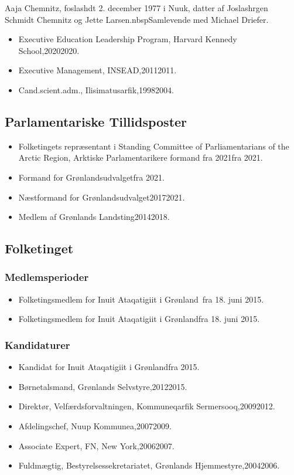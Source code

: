 \documentclass[11pt, a4paper]{awesome-cv}
\begin{document}
\makecvheader[R]
\makelettertitle
\begin{cvletter}
Aaja Chemnitz, foslashdt 2. december 1977 i Nuuk, datter af Joslashrgen Schmidt Chemnitz og Jette Larsen.nbspSamlevende med Michael Driefer.

\begin{itemize}
\item Executive Education Leadership Program, Harvard Kennedy School,20202020.
\item Executive Management, INSEAD,20112011.
\item Cand.scient.adm., Ilisimatusarfik,19982004.
\end{itemize}
\subsection*{Parlamentariske Tillidsposter}
\begin{itemize}
\item Folketingets repræsentant i Standing Committee of Parliamentarians of the Arctic Region, Arktiske Parlamentarikere formand fra 2021fra 2021.
\item Formand for Grønlandsudvalgetfra 2021.
\item Næstformand for Grønlandsudvalget20172021.
\item Medlem af Grønlands Landsting20142018.
\end{itemize}
\subsection*{Folketinget}
\subsubsection*{Medlemsperioder}
\begin{itemize}
\item Folketingsmedlem for Inuit Ataqatigiit i Grønland fra 18. juni 2015.
\item Folketingsmedlem for Inuit Ataqatigiit i Grønlandfra 18. juni 2015.
\end{itemize}
\subsubsection*{Kandidaturer}
\begin{itemize}
\item Kandidat for Inuit Ataqatigiit i Grønlandfra 2015.
\end{itemize}
\begin{itemize}
\item Børnetalsmand, Grønlands Selvstyre,20122015.
\item Direktør, Velfærdsforvaltningen, Kommuneqarfik Sermersooq,20092012.
\item Afdelingschef, Nuup Kommunea,20072009.
\item Associate Expert, FN, New York,20062007.
\item Fuldmægtig, Bestyrelsessekretariatet, Grønlands Hjemmestyre,20042006.
\end{itemize}
\end{cvletter}
\end{document}
